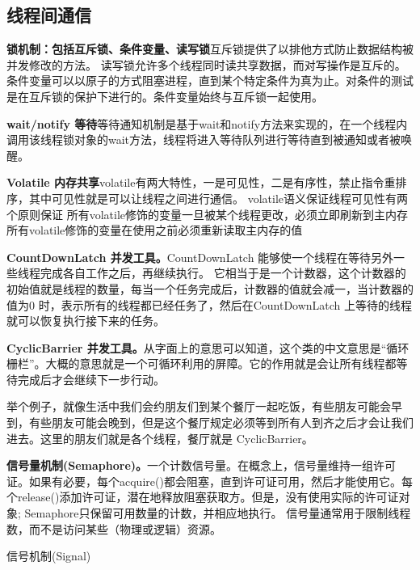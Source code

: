 \documentclass[../../../interview-questions.tex]{subfiles}
\begin{document}
\subsection{线程间通信}

\textbf{锁机制：包括互斥锁、条件变量、读写锁}互斥锁提供了以排他方式防止数据结构被并发修改的方法。 读写锁允许多个线程同时读共享数据，而对写操作是互斥的。 条件变量可以以原子的方式阻塞进程，直到某个特定条件为真为止。对条件的测试是在互斥锁的保护下进行的。条件变量始终与互斥锁一起使用。

\textbf{wait/notify 等待}等待通知机制是基于wait和notify方法来实现的，在一个线程内调用该线程锁对象的wait方法，线程将进入等待队列进行等待直到被通知或者被唤醒。

\textbf{Volatile 内存共享}volatile有两大特性，一是可见性，二是有序性，禁止指令重排序，其中可见性就是可以让线程之间进行通信。
volatile语义保证线程可见性有两个原则保证
所有volatile修饰的变量一旦被某个线程更改，必须立即刷新到主内存
所有volatile修饰的变量在使用之前必须重新读取主内存的值

\textbf{CountDownLatch 并发工具。}CountDownLatch 能够使一个线程在等待另外一些线程完成各自工作之后，再继续执行。 它相当于是一个计数器，这个计数器的初始值就是线程的数量，每当一个任务完成后，计数器的值就会减一，当计数器的值为0 时，表示所有的线程都已经任务了，然后在CountDownLatch 上等待的线程就可以恢复执行接下来的任务。

\textbf{CyclicBarrier 并发工具。}从字面上的意思可以知道，这个类的中文意思是“循环栅栏”。大概的意思就是一个可循环利用的屏障。它的作用就是会让所有线程都等待完成后才会继续下一步行动。

举个例子，就像生活中我们会约朋友们到某个餐厅一起吃饭，有些朋友可能会早到，有些朋友可能会晚到，但是这个餐厅规定必须等到所有人到齐之后才会让我们进去。这里的朋友们就是各个线程，餐厅就是 CyclicBarrier。

\textbf{信号量机制(Semaphore)。}一个计数信号量。在概念上，信号量维持一组许可证。如果有必要，每个acquire()都会阻塞，直到许可证可用，然后才能使用它。每个release()添加许可证，潜在地释放阻塞获取方。但是，没有使用实际的许可证对象; Semaphore只保留可用数量的计数，并相应地执行。
信号量通常用于限制线程数，而不是访问某些（物理或逻辑）资源。


信号机制(Signal)
\end{document}
